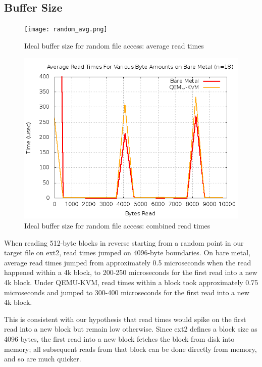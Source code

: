 \documentclass[letterpaper,twocolumn,10pt]{article}
\begin{document}
\subsection{Buffer Size}
\begin{figure}[!ht]
\texttt{[image: random\_avg.png]}
\caption{Ideal buffer size for random file access: average read times}
\end{figure}
\begin{figure}[!ht]
\includegraphics[scale=.35]{random_combined.png}
\caption{Ideal buffer size for random file access: combined read times}
\end{figure}

When reading 512-byte blocks in reverse starting from a random point in our target file on ext2, read times jumped on 4096-byte boundaries. On bare metal, average read times jumped from approximately 0.5 microseconds when the read happened within a 4k block, to 200-250 microseconds for the first read into a new 4k block. Under QEMU-KVM, read times within a block  took approximately 0.75 microseconds and jumped to 300-400 microseconds for the first read into a new 4k block.  

This is consistent with our hypothesis that read times would spike on the first read into a new block but remain low otherwise. Since ext2 defines a block size as 4096 bytes, the first read into a new block fetches the block from disk into memory; all subsequent reads from that block can be done directly from memory, and so are much quicker.
\end{document}
